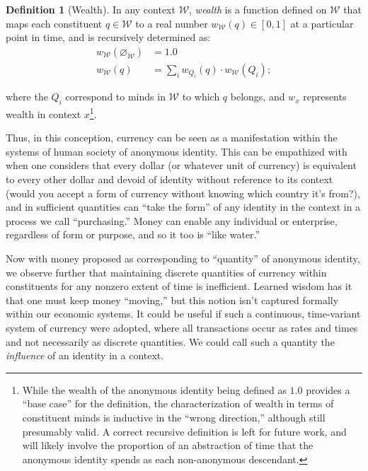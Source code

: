 \documentclass[pra,twocolumn,groupedaddress,10pt]{revtex4}
\theoremstyle{definition}
\newtheorem{defn}{Definition}[section]
\begin{document}
\begin{defn}[Wealth]
	In any context $\mathcal{W}$, \emph{wealth} is a function defined on $\mathcal{W}$ that maps each constituent $q \in \mathcal{W}$ to a real number $w_{\mathcal{W}}(q) \in [0, 1]$ at a particular point in time, and is recursively determined as:
	\begin{equation} \label{eq:wealth}
		\begin{split}
			w_{\mathcal{W}}(\varnothing_{\mathcal{W}}) &= 1.0 \\
			w_{\mathcal{W}}(q) &= \sum_{i} w_{Q_i}(q) \cdot w_{\mathcal{W}}(Q_i) ;
		\end{split}
	\end{equation}

	where the $Q_{i}$ correspond to minds in $\mathcal{W}$ to which $q$ belongs, and $w_{x}$ represents wealth in context $x$\footnote{While the wealth of the anonymous identity being defined as $1.0$ provides a ``base case'' for the definition, the characterization of wealth in terms of constituent minds is inductive in the ``wrong direction,'' although still presumably valid. A correct recursive definition is left for future work, and will likely involve the proportion of an abstraction of time that the anonymous identity spends as each non-anonymous descendant.}.
\end{defn}

Thus, in this conception, currency can be seen as a manifestation within the systems of human society of anonymous identity. This can be empathized with when one considers that every dollar (or whatever unit of currency) is equivalent to every other dollar and devoid of identity without reference to its context (would you accept a form of currency without knowing which country it's from?), and in sufficient quantities can ``take the form'' of any identity in the context in a process we call ``purchasing.'' Money can enable any individual or enterprise, regardless of form or purpose, and so it too is ``like water.''

Now with money proposed as corresponding to ``quantity'' of anonymous identity, we observe further that maintaining discrete quantities of currency within constituents for any nonzero extent of time is inefficient. Learned wisdom has it that one must keep money ``moving,'' but this notion isn't captured formally within our economic systems. It could be useful if such a continuous, time-variant system of currency were adopted, where all transactions occur as rates and times and not necessarily as discrete quantities. We could call such a quantity the \textit{influence} of an identity in a context.
\end{document}
